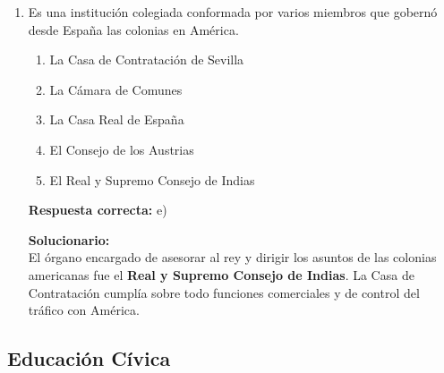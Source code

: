 \begin{enumerate}
	\vspace{2mm}
	\textbf{Solucionario:}\\
	Los \textbf{curacas} eran los jefes locales de los ayllus y actuaban como intermediarios entre la autoridad incaica y la población. Cumplían funciones administrativas, productivas y de organización del trabajo.
	
	\vspace{6mm}
	
	\item Es una institución colegiada conformada por varios miembros que gobernó desde España las colonias en América.
	\begin{enumerate}[label=\alph*)]
		\item La Casa de Contratación de Sevilla
		\item La Cámara de Comunes
		\item La Casa Real de España
		\item El Consejo de los Austrias
		\item El Real y Supremo Consejo de Indias
	\end{enumerate}
	\textbf{Respuesta correcta:} e)
	
	\vspace{2mm}
	\textbf{Solucionario:}\\
	El órgano encargado de asesorar al rey y dirigir los asuntos de las colonias americanas fue el \textbf{Real y Supremo Consejo de Indias}. La Casa de Contratación cumplía sobre todo funciones comerciales y de control del tráfico con América.
	
	\vspace{6mm}
	
\end{enumerate}

\subsection*{Educación Cívica}

